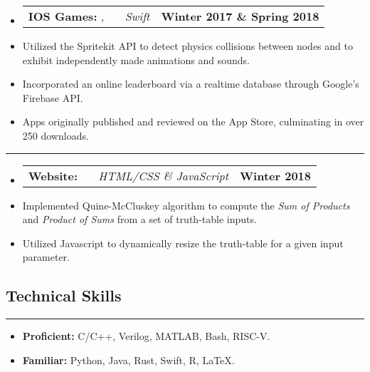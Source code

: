 \documentclass[10pt,letterpaper]{article}
\makeatletter
\newcommand{\header}[2]
{
	\begin{tabular*}{\linewidth}{l @{\extracolsep{\fill}} r}
		\hspace{-27pt} #1 & #2 \\
	\end{tabular*}
}
\newcommand{\sectionbreak}
{
	\vspace{-1.2em}
	\rule{\textwidth}{1.7pt}
	\vspace{-1.7em}
}
\makeatother
\begin{document}
\begin{itemize}
	\item[]
		\header
		{
			\textbf{IOS Games: }
			\href{https://appadvice.com/app/round-bound/1369632746}{\emph{\underline{\smash{Round 'a Bound}}}}, 
			\href{https://appadvice.com/app/tic-tac-emoji/1346934986}{\emph{\underline{\smash{Tic-Tac Emoji}}}} \ \ \ \footnotesize  \emph{Swift}
		}
			{\textbf{Winter 2017 \& Spring 2018}}
		\item 
			Utilized the Spritekit API to detect physics collisions between nodes and to exhibit independently made animations and sounds.
		\item
			Incorporated an online leaderboard via a realtime database through Google's Firebase API.
		\item
			Apps originally published and reviewed on the App Store, culminating in over 250 downloads.
\end{itemize}

\hrule

\begin{itemize}
	\item[]
		\header
			{	
				\textbf{Website: }
				\href{https://aashpointo.github.io/KmapWebsite/}{\emph{\underline{\smash{aashpointo.github.io/KmapWebsite}}}} \ \ \ \footnotesize \emph{HTML/CSS \& JavaScript}
				}
				{\textbf{Winter 2018}}
		\item
			Implemented Quine-McCluskey algorithm to compute the \emph{Sum of Products} and \emph{Product of Sums} from a set of truth-table inputs.
		\item
			Utilized Javascript to dynamically resize the truth-table for a given input parameter.

\end{itemize}

\vspace{-1.5em}
\subsection*{Technical Skills}
\sectionbreak

\begin{itemize}

	\item
		\textbf{Proficient:} C/C++, Verilog, MATLAB, Bash, RISC-V. 
	\item
		\textbf{Familiar:} Python, Java, Rust, Swift, R, \LaTeX.
\end{itemize}
\end{document}
